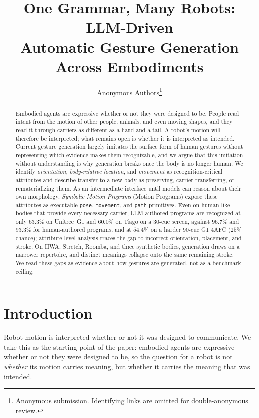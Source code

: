 \documentclass[letterpaper,10pt,conference]{ieeeconf}
\title{One Grammar, Many Robots: LLM-Driven\\Automatic Gesture Generation Across Embodiments}
\author{Anonymous Authors\thanks{Anonymous submission. Identifying links are omitted for double-anonymous review.}}
\newcommand{\method}{Motion Program}
\newcommand{\methodfull}{Symbolic Motion Program}
\begin{document}
\maketitle
\thispagestyle{empty}
\pagestyle{empty}

\begin{abstract}
Embodied agents are expressive whether or not they were designed to be. People read intent from the motion of other people, animals, and even moving shapes, and they read it through carriers as different as a hand and a tail. A robot's motion will therefore be interpreted; what remains open is whether it is interpreted as intended. Current gesture generation largely imitates the surface form of human gestures without representing which evidence makes them recognizable, and we argue that this imitation without understanding is why generation breaks once the body is no longer human. We identify \emph{orientation}, \emph{body-relative location}, and \emph{movement} as recognition-critical attributes and describe transfer to a new body as preserving, carrier-transferring, or rematerializing them. As an intermediate interface until models can reason about their own morphology, \textit{\methodfull{}s} (\method{}s) expose these attributes as executable \texttt{pose}, \texttt{movement}, and \texttt{path} primitives. Even on human-like bodies that provide every necessary carrier, LLM-authored programs are recognized at only $63.3\%$ on Unitree~G1 and $60.0\%$ on Tiago on a 30-cue screen, against $96.7\%$ and $93.3\%$ for human-authored programs, and at $54.4\%$ on a harder 90-cue G1 4AFC ($25\%$ chance); attribute-level analysis traces the gap to incorrect orientation, placement, and stroke. On IIWA, Stretch, Roomba, and three synthetic bodies, generation draws on a narrower repertoire, and distinct meanings collapse onto the same remaining stroke. We read these gaps as evidence about how gestures are generated, not as a benchmark ceiling.
\end{abstract}

\section{Introduction}
Robot motion is interpreted whether or not it was designed to communicate. We take this as the starting point of the paper: embodied agents are expressive whether or not they were designed to be, so the question for a robot is not \emph{whether} its motion carries meaning, but whether it carries the meaning that was intended.
\end{document}
